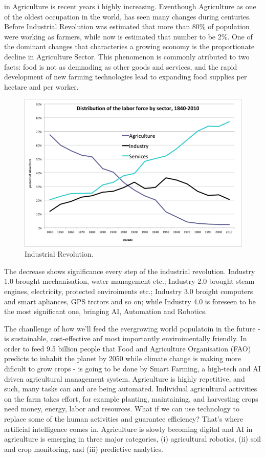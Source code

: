\documentclass[10pt,jaurnal,compsoc]{IEEEtran}
\begin{document}
 in Agriculture is recent years i highly increasing. Eventhough Agriculture as one of the oldest occupation in the world, has seen many changes during centuries. Before Industrial Revolution was estimated that more than 80\% of population were working as farmers, while now is estimated that number to be 2\%. One of the dominant changes that characteries a growing economy is the proportionate decline in Agriculture Sector. This phenomenon is commonly atributed to two facts: food is not as demnading as other goods and services, and the rapid development of new farming technologies lead to expanding food supplies per hectare and per worker.
\begin{figure}[thpb]
      \centering
      \includegraphics[width=\linewidth]{agridecline}
      \caption{Industrial Revolution.}
      \label{fig:robot1}
\end{figure}

The decrease shows significance every step of the industrial revolution. Industry 1.0 brought mechanisation, water management etc.; Industry 2.0 brought steam engines, electricity, protected enviroiments etc.; Industry 3.0 broight computers and smart apliances, GPS trctors and so on; while Industry 4.0 is foreseen to be the most significant one, bringing AI, Automation and Robotics.

The chanllenge of how we'll feed the evergrowing world populatoin in the future - is sustainable, cost-effective anf most importantly enviroimentally friendly. In order to feed 9.5 billion people that Food and Agriculture Organisation (FAO) predicts to inhabit the planet by 2050 while climate change is making more dificult to grow crops - is going to be done by Smart Farming, a high-tech and AI driven agricultural management system. Agriculture is highly repetitive, and such, many tasks can and are being automated. Individual agricultural activities on the farm takes effort, for example planting, maintaining, and harvesting crops need money, energy, labor and resources. What if we can use technology to replace some of the human activities and guarantee efficiency? That’s where artificial intelligence comes in. Agriculture is slowly becoming digital and AI in agriculture is emerging in three major categories, (i) agricultural robotics, (ii) soil and crop monitoring, and (iii) predictive analytics.
\end{document}
